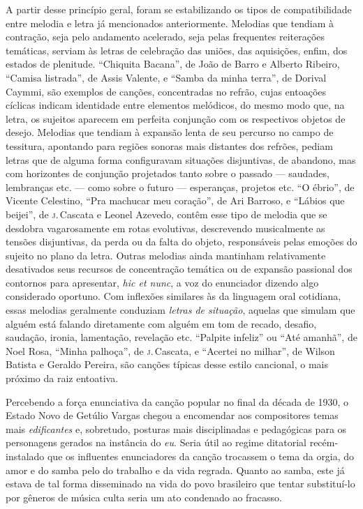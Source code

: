A partir desse princípio geral, foram se estabilizando os tipos de
compatibilidade entre melodia e letra já mencionados anteriormente.
Melodias que tendiam à contração, seja pelo andamento acelerado, seja
pelas frequentes reiterações temáticas, serviam às letras de celebração
das uniões, das aquisições, enfim, dos estados de plenitude. ``Chiquita
Bacana'', de João de Barro e Alberto Ribeiro, ``Camisa listrada'', de Assis
Valente, e ``Samba da minha terra'', de Dorival Caymmi, são exemplos de
canções, concentradas no refrão, cujas entoações cíclicas indicam
identidade entre elementos melódicos, do mesmo modo que, na letra, os
sujeitos aparecem em perfeita conjunção com os respectivos objetos de
desejo. Melodias que tendiam à expansão lenta de seu percurso no campo
de tessitura, apontando para regiões sonoras mais distantes dos refrões,
pediam letras que de alguma forma configuravam situações disjuntivas, de
abandono, mas com horizontes de conjunção projetados tanto sobre o
passado --- saudades, lembranças etc. --- como sobre o futuro --- esperanças,
projetos etc. ``O ébrio'', de Vicente Celestino, ``Pra machucar meu
coração'', de Ari Barroso, e ``Lábios que beijei'', de \textsc{j}.\,Cascata e Leonel
Azevedo, contêm esse tipo de melodia que se desdobra vagarosamente em
rotas evolutivas, descrevendo musicalmente as tensões disjuntivas, da
perda ou da falta do objeto, responsáveis pelas emoções do sujeito no
plano da letra. Outras melodias ainda mantinham relativamente
desativados seus recursos de concentração temática ou de expansão
passional dos contornos para apresentar, \textit{hic et nunc}, a voz do
enunciador dizendo algo considerado oportuno. Com inflexões similares às
da linguagem oral cotidiana, essas melodias geralmente conduziam
\textit{letras de situação}, aquelas que simulam que alguém está falando
diretamente com alguém em tom de recado, desafio, saudação, ironia,
lamentação, revelação etc. ``Palpite infeliz'' ou ``Até amanhã'', de Noel
Rosa, ``Minha palhoça'', de \textsc{j}.\,Cascata, e ``Acertei no milhar'', de Wilson
Batista e Geraldo Pereira, são canções típicas desse estilo cancional, o
mais próximo da raiz entoativa.

Percebendo a força enunciativa da canção popular no final da década de
1930, o Estado Novo de Getúlio Vargas chegou a encomendar aos
compositores temas mais \textit{edificantes} e, sobretudo, posturas mais
disciplinadas e pedagógicas para os personagens gerados na instância do
\textit{eu}. Seria útil ao regime ditatorial recém-instalado que os
influentes enunciadores da canção trocassem o tema da orgia, do amor e
do samba pelo do trabalho e da vida regrada. Quanto ao samba, este já
estava de tal forma disseminado na vida do povo brasileiro que tentar
substituí-lo por gêneros de música culta seria um ato condenado ao
fracasso.

